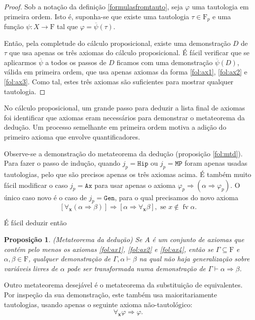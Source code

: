 \documentclass{report}
\newtheorem{prop}{Proposição}
\theoremstyle{definition}
\theoremstyle{remark}
\renewcommand{\bf}[1]{\mathbf{#1}}
\newcommand{\F}{\mathrm{F}}
\DeclareMathOperator{\fv}{fv}
\newcommand{\imply}{\mathbin{\Rightarrow}}
\begin{document}
	\begin{proof}
	Sob a notação da definição \ref{formulasfromtauto}, seja $\varphi$ uma tautologia em primeira ordem. Isto é, suponha-se que existe uma tautologia $\tau \in \F_p$ e uma função $\psi : X \to \F$ tal que $\varphi = \overline \psi(\tau)$.

	Então, pela completude do cálculo proposicional, existe uma demonstração $D$ de $\tau$ que usa apenas os três axiomas do cálculo proposicional. É fácil verificar que se aplicarmos $\overline \psi$ a todos os passos de $D$ ficamos com uma demonstração $\overline \psi(D)$, válida em primeira ordem, que usa apenas axiomas da forma \eqref{fol:ax1}, \eqref{fol:ax2} e \eqref{fol:ax3}. Como tal, estes três axiomas são suficientes para mostrar qualquer tautologia.
	\end{proof}

	No cálculo proposicional, um grande passo para deduzir a lista final de axiomas foi identificar que axiomas eram necessários para demonstrar o metateorema da dedução. Um processo semelhante em primeira ordem motiva a adição do primeiro axioma que envolve quantificadores.

	Observe-se a demonstração do metateorema da dedução (proposição \ref{fol:mtd}). Para fazer o passo de indução, quando $j_p = \mathtt{Hip}$ ou $j_p = \mathtt{MP}$ foram apenas usadas tautologias, pelo que são precisos apenas os três axiomas acima. É também muito fácil modificar o caso $j_p = \mathtt{Ax}$ para usar apenas o axioma $\varphi_p \imply (\alpha \imply \varphi_p)$. O único caso novo é o caso de $j_p = \mathtt{Gen}$, para o qual precisamos do novo axioma
\begin{equation}\label{fol:ax4}
[\forall_{\bf x}(\alpha \imply \beta)] \imply [\alpha \imply \forall_{\bf x} \beta], \text{ se $x \not \in \fv \alpha$.}
\end{equation}

	É fácil deduzir então
	\begin{prop} (Metateorema da dedução) 
	Se $A$ é um conjunto de axiomas que contém pelo menos os axiomas \eqref{fol:ax1}, \eqref{fol:ax2} e \eqref{fol:ax4}, então se $\Gamma \subseteq \F$ e $\alpha, \beta \in \F$, qualquer demonstração de $\Gamma, \alpha \vdash \beta$ na qual não haja generalização sobre variáveis livres de $\alpha$ pode ser transformada numa demonstração de $\Gamma \vdash \alpha \imply \beta$.
	\end{prop}

	Outro metateorema desejável é o metateorema da substituição de equivalentes. Por inspeção da sua demonstração, este também usa maioritariamente tautologias, usando apenas o seguinte axioma não-tautológico:
\begin{equation}\label{fol:ax5}
\forall_{\bf x} \varphi \imply \varphi.
\end{equation}
\end{document}

